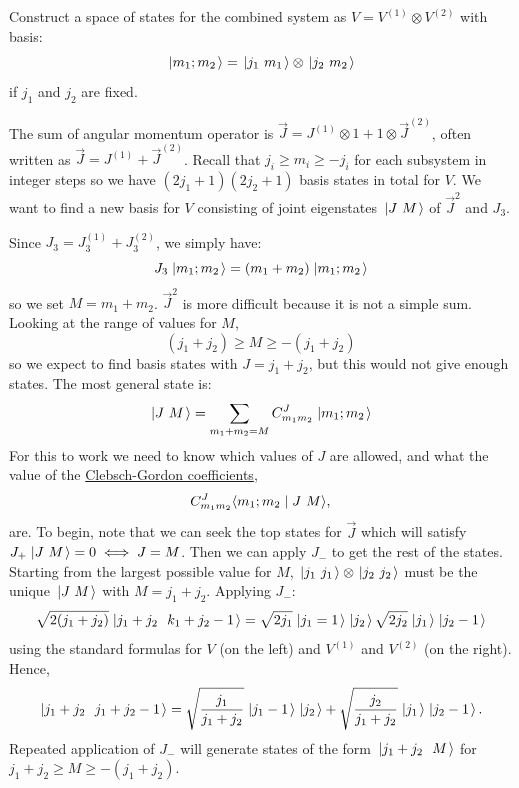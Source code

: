 \documentclass[../Main.tex]{subfiles}
\begin{document}
Construct a space of states for the combined system as $V = V^{(1)} \otimes V^{(2)}$ with basis:
\begin{equation*}
    \left.\left|m_1;m_2\right.\right\rangle = \left.\left|j_1~m_1\right.\right\rangle \otimes \left.\left|j_2~m_2\right.\right\rangle
\end{equation*}
if $j_1$ and $j_2$ are fixed.

The sum of angular momentum operator is $\vec J = J^{(1)} \otimes 1 + 1 \otimes \vec J^{(2)}$, often written as $\vec J = J^{(1)} + \vec J^{(2)}$. Recall that $j_i \geq m_i \geq -j_i$ for each subsystem in integer steps so we have $(2j_1 + 1)(2j_2 + 1)$ basis states in total for $V$. We want to find a new basis for $V$ consisting of joint eigenstates $\left.\left|J~M\right.\right\rangle$ of $\vec J^2$ and $J_3$.

Since $J_3 = J_3^{(1)} + J_3^{(2)}$, we simply have:
\begin{equation*}
    J_3 \left.\left|m_1;m_2\right.\right\rangle = (m_1 + m_2) \left.\left|m_1;m_2\right.\right\rangle
\end{equation*}
so we set $M = m_1 + m_2$. $\vec J^2$ is more difficult because it is not a simple sum. Looking at the range of values for $M$,
\begin{equation*}
    (j_1 + j_2) \geq M \geq -(j_1 + j_2)
\end{equation*}
so we expect to find basis states with $J = j_1 + j_2$, but this would not give enough states. The most general state is:
\begin{equation*}
    \left.\left|J~M\right.\right\rangle = \sum_{m_1 + m_2 = M} C^J_{m_1 m_2} \left.\left|m_1;m_2\right.\right\rangle
\end{equation*}
For this to work we need to know which values of $J$ are allowed, and what the value of the \underline{Clebsch-Gordon coefficients},
\begin{equation*}
    C^J_{m_1m_2} \langle m_1;m_2\mid J~M\rangle,
\end{equation*}
are. To begin, note that we can seek the top states for $\vec J$ which will satisfy $J_+ \left.\left|J~M\right.\right\rangle = 0 \iff J = M$. Then we can apply $J_-$ to get the rest of the states. Starting from the largest possible value for $M$, $\left.\left|j_1~j_1\right.\right\rangle \otimes \left.\left|j_2~j_2\right.\right\rangle$ must be the unique $\left.\left|J~M\right.\right\rangle$ with $M = j_1 + j_2$. Applying $J_-$:
\begin{equation*}
    \sqrt{2(j_1 + j_2)} \ket{j_1 + j_2~~k_1 + j_2 - 1} = \sqrt{2j_1} \ket{j_1 = 1}\ket{j_2} \sqrt{2j_2} \ket{j_1}\ket{j_2 - 1} %
\end{equation*}
using the standard formulas for $V$ (on the left) and $V^{(1)}$ and $V^{(2)}$ (on the right). Hence,
\begin{equation*}
    \left.\left|j_1 + j_2~~j_1 + j_2 - 1\right.\right\rangle = \sqrt{\frac{j_1}{j_1 + j_2}} \left.\left|j_1 - 1\right.\right\rangle\left.\left|j_2\right.\right\rangle + \sqrt{\frac{j_2}{j_1 + j_2}} \left.\left|j_1\right.\right\rangle \left.\left|j_2 - 1\right.\right\rangle.
\end{equation*}
Repeated application of $J_-$ will generate states of the form $\left.\left|j_1 + j_2~~M\right.\right\rangle$ for $j_1 + j_2 \geq M \geq -(j_1 + j_2)$.
\end{document}
